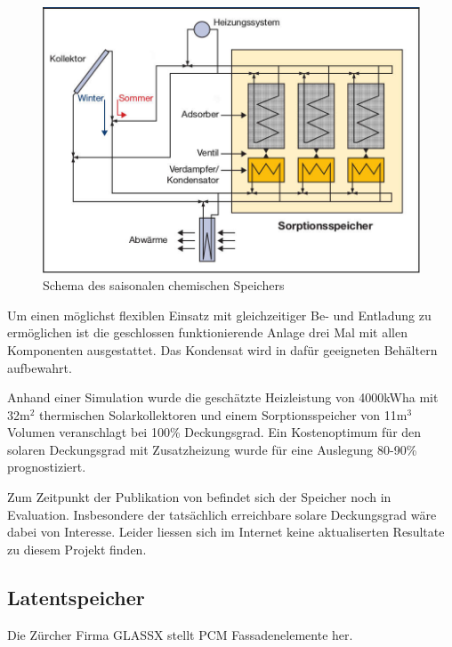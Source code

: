 \documentclass[11pt,a4paper]{scrartcl}
\begin{document}
\begin{figure}[h!]
\begin{center}
\includegraphics[scale=1]{images/energiehaus.jpg}
\caption{Schema des saisonalen chemischen Speichers \cite{BINE2}}
\label{fig:Saisonaler Speicher}
\end{center}
\end{figure}

Um einen möglichst flexiblen Einsatz mit gleichzeitiger Be- und Entladung zu
ermöglichen ist die geschlossen funktionierende Anlage drei Mal mit allen
Komponenten ausgestattet. Das Kondensat wird in dafür geeigneten Behältern
aufbewahrt. 

Anhand einer Simulation wurde die geschätzte Heizleistung von 4000kWh\/a mit
32m$^2$ thermischen Solarkollektoren und einem Sorptionsspeicher von 11m$^3$
Volumen veranschlagt bei 100\% Deckungsgrad. Ein Kostenoptimum für den solaren
Deckungsgrad mit Zusatzheizung wurde für eine Auslegung 80-90\% prognostiziert.

Zum Zeitpunkt der Publikation von \cite{BINE2} befindet sich der Speicher noch
in Evaluation. Insbesondere der tatsächlich erreichbare solare Deckungsgrad wäre
dabei von Interesse. Leider liessen sich im Internet keine aktualiserten
Resultate zu diesem Projekt finden.
\subsection{Latentspeicher}
Die Zürcher Firma GLASSX stellt PCM Fassadenelemente her. 
\end{document}
